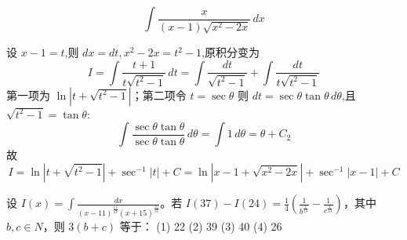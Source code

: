 \begin{questions}
    \question
    \[
    \int \frac{x}{(x-1)\sqrt{x^2-2x}} \, dx
    \]
    \begin{solution}
        设 $x-1 = t$,则 $dx = dt,x^2-2x = t^2-1$,原积分变为
        \[
        I = \int \frac{t+1}{t\sqrt{t^2-1}} \, dt = \int \frac{dt}{\sqrt{t^2-1}} + \int \frac{dt}{t\sqrt{t^2-1}}
        \]
        第一项为 $\ln|t+\sqrt{t^2-1}|$；第二项令 $t = \sec \theta$ 则 $dt = \sec \theta \tan \theta \, d\theta$,且 $\sqrt{t^2-1} = \tan \theta$:
        \[
        \int \frac{\sec \theta \tan \theta}{\sec \theta \tan \theta} \, d\theta = \int 1 \, d\theta = \theta + C_2 
        \]
        故
        \[
        I = \ln|t+\sqrt{t^2-1}| + \sec^{-1}|t| + C
        = \ln|x-1+\sqrt{x^2-2x}| + \sec^{-1}|x-1| + C
        \]
    \end{solution}
\question
设 $I(x) = \int \frac{dx}{(x-11)^{\frac{11}{13}}(x+15)^{\frac{15}{13}}}$。若 $I(37) - I(24) = \frac{1}{4} \left( \frac{1}{b^{\frac{1}{13}}} - \frac{1}{c^{\frac{1}{13}}} \right)$，其中 $b, c \in N$，则 $3(b + c)$ 等于：
(1) 22 \quad (2) 39 \quad (3) 40 \quad (4) 26


\end{questions}
